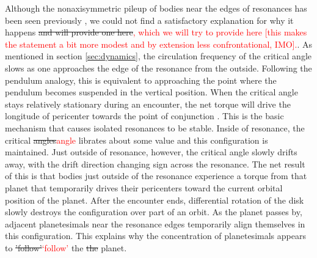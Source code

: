 \documentclass[twocolumn]{aastex63}
\newcommand{\ACBc}[1]{\textcolor{red}{#1}}
\begin{document}
Although the nonaxisymmetric pileup of bodies near the edges of resonances has been seen previously 
\citep{2000Icar..143...45R, 2016ApJ...818..159T}, we could not find a satisfactory explanation for why it happens\sout{ and will provide one here}\ACBc{, which we will try to provide here [this makes the statement a bit more modest and by extension less confrontational, IMO].}. As 
mentioned in section \ref{sec:dynamics}, the circulation frequency of the critical angle slows as one approaches the edge of the resonance from the outside. Following the pendulum analogy, this is equivalent to approaching the point where the pendulum becomes suspended in the vertical position. When the critical angle stays relatively stationary during an encounter, the net torque will drive the longitude of pericenter towards the point of conjunction \citep{1976ARA&A..14..215P}.  This is the basic mechanism that causes isolated resonances to be stable. Inside of resonance, the critical \sout{angles}\ACBc{angle} librates about some value and this configuration is maintained. Just outside of resonance, however, the critical angle slowly drifts away, with the drift direction changing sign across the resonance. The net result of this is that bodies just outside of the resonance experience a torque from that planet that temporarily drives their pericenters toward the current orbital position of the planet. After the encounter ends, differential rotation of the disk slowly destroys the configuration over part of an orbit. As the planet passes by, adjacent planetesimals near the resonance edges temporarily align themselves in this configuration. This explains why the concentration of planetesimals appears to \sout{'follow'}\ACBc{`follow'} the \sout{the} planet.
\end{document}
